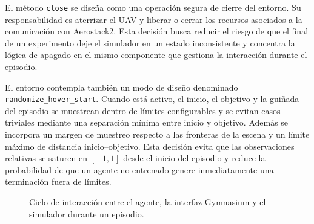 El método \texttt{close} se diseña como una operación segura de cierre del
entorno. Su responsabilidad es aterrizar el UAV y liberar o cerrar los recursos
asociados a la comunicación con Aerostack2. Esta decisión busca reducir el
riesgo de que el final de un experimento deje el simulador en un estado
inconsistente y concentra la lógica de apagado en el mismo componente que
gestiona la interacción durante el episodio.

El entorno contempla también un modo de diseño denominado
\texttt{randomize\_hover\_start}. Cuando está activo, el inicio, el objetivo y la
guiñada del episodio se muestrean dentro de límites configurables y se evitan
casos triviales mediante una separación mínima entre inicio y objetivo. Además se incorpora
 un margen de muestreo respecto a
las fronteras de la escena y un límite máximo de distancia inicio--objetivo. Esta
decisión evita que las observaciones relativas se saturen en $[-1,1]$ desde el
inicio del episodio y reduce la probabilidad de que un agente no entrenado
genere inmediatamente una terminación fuera de límites.

\begin{figure}[t]
\centering
\shorthandoff{<>}
\shorthandon{<>}
\caption{Ciclo de interacción entre el agente, la interfaz Gymnasium y el
simulador durante un episodio.}
\label{fig:diseno:ciclo_gymnasium}
\end{figure}

